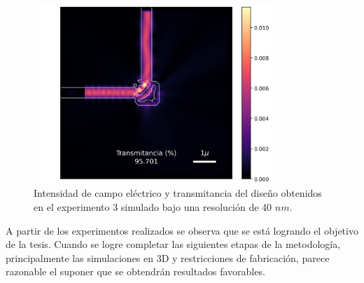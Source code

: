 \begin{figure}
  \centering
  \includegraphics[width=0.80\textwidth]{image/results/device.png}
  \caption{Intensidad de campo eléctrico y transmitancia del diseño obtenidos en el experimento 3 simulado bajo una resolución de 40 $nm$.}
  \label{fig:exp3}
\end{figure}


A partir de los experimentos realizados se observa que se está logrando el objetivo de la tesis.
Cuando se logre completar las siguientes etapas de la metodología, principalmente las simulaciones en 3D y restricciones de fabricación, parece razonable el suponer que se obtendrán resultados favorables.
